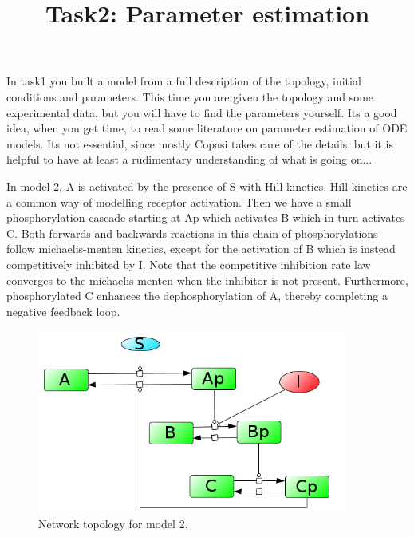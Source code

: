 \documentclass[11pt]{article}
\title{Task2: Parameter estimation}
\begin{document}
\maketitle
    In task1 you built a model from a full description of the topology, initial conditions and parameters. This
    time you are given the topology and some experimental data, but you will have to find the parameters yourself. Its
    a good idea, when you get time, to read some literature on parameter estimation of ODE models. Its not essential,
    since mostly Copasi takes care of the details, but it is helpful to have at least a rudimentary understanding of
    what is going on...

    In model 2, A is activated by the presence of S with Hill kinetics. Hill kinetics are a common way of modelling
    receptor activation. Then we have a small phosphorylation cascade starting at Ap which activates B which in turn
    activates C. Both forwards and backwards reactions in this chain of phosphorylations follow michaelis-menten
    kinetics, except for the activation of B which is instead competitively inhibited by I. Note that the competitive
    inhibition rate law converges to the michaelis menten when the inhibitor is not present. Furthermore,
    phosphorylated C enhances the dephosphorylation of A, thereby completing a negative feedback loop.

    \begin{figure}[h]
        \centering
        \includegraphics[width=0.9\textwidth]{figures/Model2.png}
        \caption{Network topology for model 2. }
    \end{figure}
\end{document}
